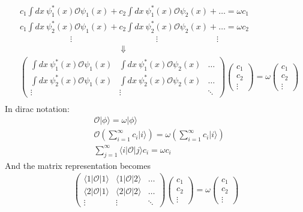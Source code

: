 \documentclass[12pt]{article}
\begin{document}
\[
\begin{split}
    & c_1 \int dx \: \psi^*_1(x) \mathcal{O} \psi_1(x) + c_2 \int dx \: \psi^*_1(x) \mathcal{O} \psi_2(x) + \ldots = \omega c_1 \\
    & c_1 \int dx \: \psi^*_2(x) \mathcal{O} \psi_1(x) + c_2 \int dx \: \psi^*_2(x) \mathcal{O} \psi_2(x) + \ldots = \omega c_2 \\
    & \qquad\qquad\qquad \vdots \qquad\qquad\qquad\qquad\qquad \vdots \qquad\qquad\qquad\quad \vdots\\[1em]
    & \qquad\qquad\qquad\qquad\qquad\qquad \Downarrow \\[1em]
    &\begin{pmatrix}
     \int dx \: \psi^*_1(x) \mathcal{O} \psi_1(x)  & \int dx \: \psi^*_1(x) \mathcal{O} \psi_2(x) & \ldots  \\
     \int dx \: \psi^*_2(x) \mathcal{O} \psi_1(x) & \int dx \: \psi^*_2(x) \mathcal{O} \psi_2(x) & \ldots  \\
    \vdots & \vdots & \ddots 
    \end{pmatrix} \begin{pmatrix}
        c_1 \\ c_2 \\ \vdots
    \end{pmatrix} = \omega \begin{pmatrix}
        c_1 \\ c_2 \\ \vdots
    \end{pmatrix}\\[1em]
\end{split}
\]
In dirac notation:
\[
\begin{split}
    & \mathcal{O} | \phi \rangle = \omega | \phi \rangle \\[1em]
    & \mathcal{O} \left( \sum_{i=1}^{\infty} c_i | i\rangle \right) = \omega \left( \sum_{i=1}^{\infty} c_i | i\rangle \right) \\[1em]
    & \sum_{j=1}^{\infty} \langle i | \mathcal{O} | j \rangle c_i = \omega c_i
\end{split}
\]
And the matrix representation becomes
\[
\begin{split}
    \begin{pmatrix}
     \langle 1 | \mathcal{O} | 1 \rangle  & \langle 1 | \mathcal{O} | 2 \rangle & \ldots  \\
     \langle 2 | \mathcal{O} | 1 \rangle & \langle 2 | \mathcal{O} | 2 \rangle & \ldots  \\
    \vdots & \vdots & \ddots 
    \end{pmatrix} \begin{pmatrix}
        c_1 \\ c_2 \\ \vdots
    \end{pmatrix} = \omega \begin{pmatrix}
        c_1 \\ c_2 \\ \vdots
    \end{pmatrix}
\end{split}
\]
\end{document}
